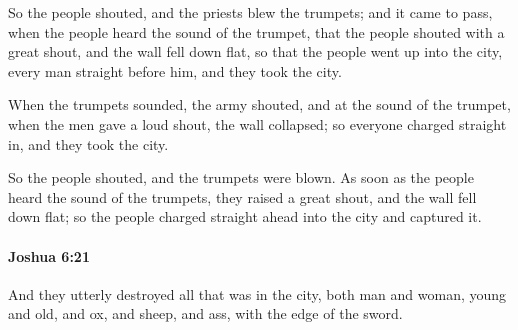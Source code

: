 			\begin{versebox}
					\item[BHS] 
					\item[ASV] So the people shouted, and the priests blew the trumpets; and it came to pass, when the people heard the sound of the trumpet, that the people shouted with a great shout, and the wall fell down flat, so that the people went up into the city, every man straight before him, and they took the city.
					\item[NIV] When the trumpets sounded, the army shouted, and at the sound of the trumpet, when the men gave a loud shout, the wall collapsed; so everyone charged straight in, and they took the city.
					\item[NRSV] So the people shouted, and the trumpets were blown. As soon as the people heard the sound of the trumpets, they raised a great shout, and the wall fell down flat; so the people charged straight ahead into the city and captured it.
			\end{versebox}

		\paragraph{Joshua 6:21} %
			\label{JOSHUA-6-21}

			And they utterly destroyed all that was in the city, both man and woman, young and old, and ox, and sheep, and ass, with the edge of the sword.

